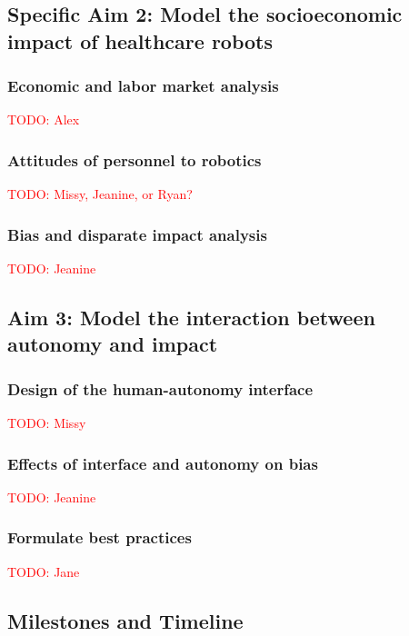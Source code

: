 \subsection{Specific Aim 2: Model the socioeconomic impact of healthcare robots}\label{sec:plan-task2}
\subsubsection{Economic and labor market analysis}
\textcolor{red}{TODO: Alex}

\subsubsection{Attitudes of personnel to robotics}
\textcolor{red}{TODO: Missy, Jeanine, or Ryan?}

\subsubsection{Bias and disparate impact analysis}
\textcolor{red}{TODO: Jeanine}

\subsection{Aim 3: Model the interaction between autonomy and impact}\label{sec:plan-task3}

\subsubsection{Design of the human-autonomy interface}
\textcolor{red}{TODO: Missy}

\subsubsection{Effects of interface and autonomy on bias}
\textcolor{red}{TODO: Jeanine}

\subsubsection{Formulate best practices}
\textcolor{red}{TODO: Jane}



\subsection{Milestones and Timeline}

